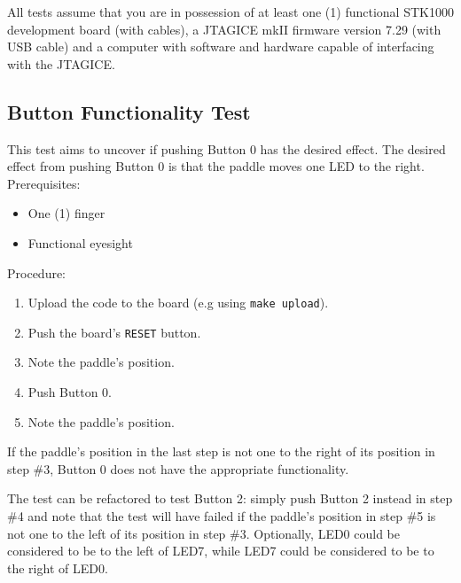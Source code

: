 All tests assume that you are in possession of at least one (1) functional STK1000 development board (with cables), a JTAGICE mkII firmware version 7.29 (with USB cable) and a computer with software and hardware capable of interfacing with the JTAGICE.
\subsection{Button Functionality Test}
This test aims to uncover if pushing Button 0 has the desired effect. The desired effect from pushing Button 0 is that the paddle moves one LED to the right.
\\ Prerequisites:
\begin{itemize}
	\item One (1) finger
	\item Functional eyesight
\end{itemize}
Procedure:
\begin{enumerate}
	\item Upload the code to the board (e.g using \texttt{make upload}).
	\item Push the board's \texttt{RESET} button.
	\item Note the paddle's position.
	\item Push Button 0.
	\item Note the paddle's position.
\end{enumerate}
If the paddle's position in the last step is not one to the right of its position in step \#3, Button 0 does not have the appropriate functionality.

The test can be refactored to test Button 2: simply push Button 2 instead in step \#4 and note that the test will have failed if the paddle's position in step \#5 is not one to the left of its position in step \#3.
Optionally, LED0 could be considered to be to the left of LED7, while LED7 could be considered to be to the right of LED0.

